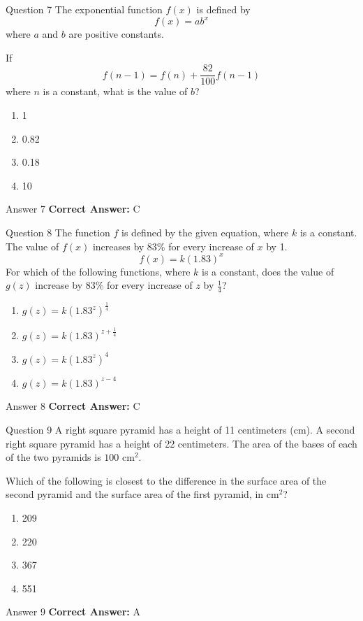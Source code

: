 \documentclass{beamer}
\begin{document}
\begin{frame}{Question 7}
\small
The exponential function \(f(x)\) is defined by
\[
f(x) = ab^x
\]
where \(a\) and \(b\) are positive constants.

If
\[
f(n - 1) = f(n) + \frac{82}{100} f(n - 1)
\]
where \(n\) is a constant, what is the value of \(b\)?
\vspace{0.35cm}
\begin{enumerate}
    \item[A.] 1
    \item[B.] 0.82
    \item[C.] 0.18
    \item[D.] 10
\end{enumerate}
\end{frame}
\begin{frame}{Answer 7}
\small
\textbf{Correct Answer:} C
\end{frame}

\begin{frame}{Question 8}
\small
The function \(f\) is defined by the given equation, where \(k\) is a constant.
The value of \(f(x)\) increases by 83\% for every increase of \(x\) by 1.
\[
f(x) = k(1.83)^x
\]
For which of the following functions, where \(k\) is a constant, does the value of \(g(z)\) increase by 83\% for every increase of \(z\) by \(\frac{1}{4}\)?
\vspace{0.35cm}
\begin{enumerate}
    \item[A.] \(g(z) = k(1.83^z)^{\frac{1}{4}}\)
    \item[B.] \(g(z) = k(1.83)^{z + \frac{1}{4}}\)
    \item[C.] \(g(z) = k(1.83^z)^4\)
    \item[D.] \(g(z) = k(1.83)^{z - 4}\)
\end{enumerate}
\end{frame}
\begin{frame}{Answer 8}
\small
\textbf{Correct Answer:} C
\end{frame}

\begin{frame}{Question 9}
\small
A right square pyramid has a height of 11 centimeters (cm).
A second right square pyramid has a height of 22 centimeters.
The area of the bases of each of the two pyramids is \(100\text{ cm}^2\).

Which of the following is closest to the difference in the surface area of the second pyramid and the surface area of the first pyramid, in \(\text{cm}^2\)?
\vspace{0.35cm}
\begin{enumerate}
    \item[A.] 209
    \item[B.] 220
    \item[C.] 367
    \item[D.] 551
\end{enumerate}
\end{frame}
\begin{frame}{Answer 9}
\small
\textbf{Correct Answer:} A
\end{frame}
\end{document}
